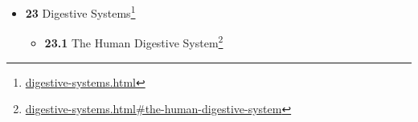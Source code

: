 \documentclass[
]{article}
\providecommand{\tightlist}{%
  \setlength{\itemsep}{0pt}\setlength{\parskip}{0pt}}
\providecommand{\tightlist}{%
  \setlength{\itemsep}{0pt}\setlength{\parskip}{0pt}}
\let\rmarkdownfootnote\footnote%
\def\footnote{\protect\rmarkdownfootnote}
\renewcommand{\href}[2]{#2\footnote{\url{#1}}}
\theoremstyle{definition}
\theoremstyle{definition}
\theoremstyle{definition}
\theoremstyle{remark}
\begin{document}
\begin{itemize}
  \begin{itemize}
  \tightlist
  \item
    \href{respiratory-systems.html\#the-mammalian-respiratory-system}{\emph{}\textbf{22.1}
    The Mammalian Respiratory System}
  \item
    \href{respiratory-systems.html\#gas-exchange}{\emph{}\textbf{22.2}
    Gas Exchange}
  \item
    \href{respiratory-systems.html\#control-of-ventilation}{\emph{}\textbf{22.3}
    Control of Ventilation}
  \item
    \href{respiratory-systems.html\#the-respiratory-system-of-birds}{\emph{}\textbf{22.4}
    The Respiratory System of Birds}
  \item
    \href{respiratory-systems.html\#the-respiratory-system-of-reptiles}{\emph{}\textbf{22.5}
    The Respiratory System of Reptiles}
  \item
    \href{respiratory-systems.html\#the-respiratory-system-of-amphibians}{\emph{}\textbf{22.6}
    The Respiratory System of Amphibians}
  \item
    \href{respiratory-systems.html\#the-respiratory-system-of-fish}{\emph{}\textbf{22.7}
    The Respiratory System of Fish}
  \item
    \href{respiratory-systems.html\#the-respiratory-system-of-arthropods}{\emph{}\textbf{22.8}
    The Respiratory System of Arthropods}
  \item
    \href{respiratory-systems.html\#the-respiratory-system-of-molluscs}{\emph{}\textbf{22.9}
    The Respiratory System of Molluscs}
  \item
    \href{respiratory-systems.html\#the-respiratory-system-of-plants}{\emph{}\textbf{22.10}
    The Respiratory System of Plants}
  \end{itemize}
\item
  \href{digestive-systems.html}{\emph{}\textbf{23} Digestive Systems}

  \begin{itemize}
  \tightlist
  \item
    \href{digestive-systems.html\#the-human-digestive-system}{\emph{}\textbf{23.1}
    The Human Digestive System}


\end{itemize}
\end{itemize}
\end{document}
